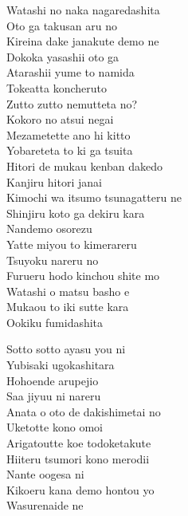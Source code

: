 \def\songtitle{Pianoforte Monologue}
\def\songcomment{}
\def\songlyrics{Aki Hata}
\def\songwriter{Hiroaki Aoki \& Yuya Hirozawa}
\def\songarrange{Hiroaki Aoki \& Yuya Hirozawa}
   
\ifdefined\COMPLETE
\else
	
	
\fi
\thispagestyle{song}

\begin{multicols}{2}
Watashi no naka nagaredashita\\
Oto ga takusan aru no\\
Kireina dake janakute demo ne\\
Dokoka yasashii oto ga\\
Atarashii yume to namida\\
Tokeatta koncheruto\\

Zutto zutto nemutteta no?\\
Kokoro no atsui negai\\
Mezametette ano hi kitto\\
Yobareteta to ki ga tsuita\\

Hitori de mukau kenban dakedo\\
Kanjiru hitori janai\\
Kimochi wa itsumo tsunagatteru ne\\
Shinjiru koto ga dekiru kara\\
Nandemo osorezu\\
Yatte miyou to kimerareru\\
Tsuyoku nareru no\\

Furueru hodo kinchou shite mo\\
Watashi o matsu basho e\\
Mukaou to iki sutte kara\\
Ookiku fumidashita\columnbreak

Sotto sotto ayasu you ni\\
Yubisaki ugokashitara\\
Hohoende arupejio\\
Saa jiyuu ni nareru\\

Anata o oto de dakishimetai no\\
Uketotte kono omoi\\
Arigatoutte koe todoketakute\\
Hiiteru tsumori kono merodii\\
Nante oogesa ni\\
Kikoeru kana demo hontou yo\\
Wasurenaide ne\\


\end{multicols}
